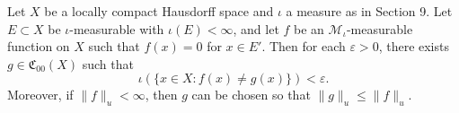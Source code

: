 Let $X$ be a locally compact Hausdorff space and $\iota$ a measure as in Section 9. Let $E \subset X$ be $\iota$-measurable with $\iota(E) < \infty$, and let $f$ be an $\mathcal{M}_\iota$-measurable function on $X$ such that $f(x) = 0$ for $x \in E'$. Then for each $\varepsilon > 0$, there exists $g \in \mathfrak{C}_{00}(X)$ such that
$$\iota(\{x \in X : f(x) \neq g(x)\}) < \varepsilon.$$
Moreover, if $\|f\|_u < \infty$, then $g$ can be chosen so that $\|g\|_u \leq \|f\|_u$.